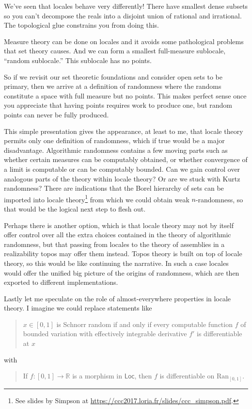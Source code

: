 \documentclass[14pt]{extarticle}
\newcommand{\Locale}{\ensuremath{\mathsf{Loc}}}
\newcommand{\ran}{\ensuremath{\mathrm{Ran}}}
\begin{document}
We've seen that locales behave very differently! There have smallest dense subsets so you can't decompose the reals into a disjoint union of rational and irrational. The topological glue constrains you from doing this.

Measure theory can be done on locales and it avoids some pathological problems that set theory causes. And we can form a smallest full-measure sublocale, ``random sublocale.'' This sublocale has no points.

So if we revisit our set theoretic foundations and consider open sets to be primary, then we arrive at a definition of randomness where the randoms constitute a space with full measure but no points. This makes perfect sense once you appreciate that having points requires work to produce one, but random points can never be fully produced.

This simple presentation gives the appearance, at least to me, that locale theory permits only one definition of randomness, which if true would be a major disadvantage. Algorithmic randomness contains a few moving parts such as whether certain measures can be computably obtained, or whether convergence of a limit is computable or can be computably bounded. Can we gain control over analogous parts of the theory within locale theory? Or are we stuck with Kurtz randomness? There are indications that the Borel hierarchy of sets can be imported into locale theory\footnote{See slides by Simpson at \url{https://ccc2017.loria.fr/slides/ccc_simpson.pdf}.} from which we could obtain weak $n$-randomness, so that would be the logical next step to flesh out.

Perhaps there is another option, which is that locale theory may not by itself offer control over all the extra choices contained in the theory of algorithmic randomness, but that passing from locales to the theory of assemblies in a realizability topos may offer them instead. Topos theory is built on top of locale theory, so this would be like continuing the narrative. In such a case locales would offer the unified big picture of the origins of randomness, which are then exported to different implementations.

Lastly let me speculate on the role of almost-everywhere properties in locale theory. I imagine we could replace statements like 
\begin{quote}
$x\in [0,1]$ is Schnorr random if and only if every computable function $f$ of bounded variation with effectively integrable derivative $f'$ is differentiable at $x$
\end{quote}
with 
\begin{quote}
If $f:[0,1]\to\mathbb{R}$ is a morphism in \Locale, then $f$ is differentiable on $\ran_{[0,1]}$.
\end{quote}
\end{document}
